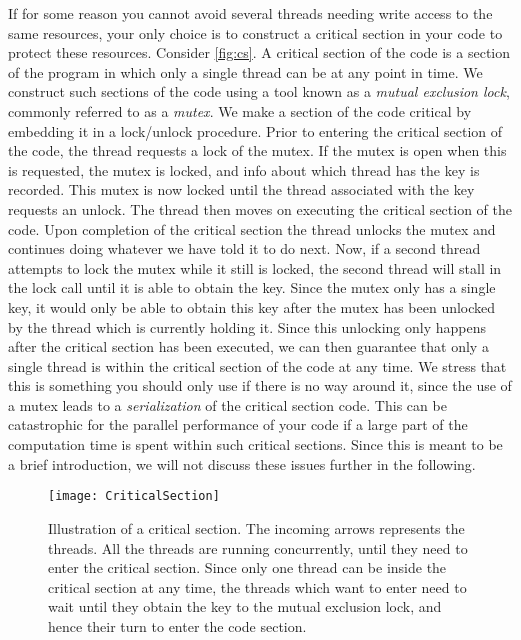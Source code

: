 If for some reason you cannot avoid several threads needing write access to the
same resources, your only choice is to construct a critical section in your code
to protect these resources. Consider \autoref{fig:cs}. A critical section of the
code is a section of the program in which only a single thread can be at any
point in time. We construct such sections of the code using a tool known as a
\emph{mutual exclusion lock}, commonly referred to as a \emph{mutex}. We make a
section of the code critical by embedding it in a lock/unlock procedure. Prior
to entering the critical section of the code, the thread requests a lock of the
mutex. If the mutex is open when this is requested, the mutex is locked, and
info about which thread has the key is recorded. This mutex is now locked until
the thread associated with the key requests an unlock. The thread then moves on
executing the critical section of the code. Upon completion of the critical
section the thread unlocks the mutex and continues doing whatever we have told
it to do next. Now, if a second thread attempts to lock the mutex while it still
is locked, the second thread will stall in the lock call until it is able to
obtain the key. Since the mutex only has a single key, it would only be able to
obtain this key after the mutex has been unlocked by the thread which is
currently holding it. Since this unlocking only happens after the critical
section has been executed, we can then guarantee that only a single thread is
within the critical section of the code at any time. We stress that this is
something you should only use if there is no way around it, since the use of a
mutex leads to a \emph{serialization} of the critical section code. This can be
catastrophic for the parallel performance of your code if a large part of the
computation time is spent within such critical sections. Since this is meant to
be a brief introduction, we will not discuss these issues further in the
following.

\begin{figure}
  \begin{center}
    \texttt{[image: CriticalSection]}
  \end{center}
  \caption{
    Illustration of a critical section. The incoming arrows represents the
    threads. All the threads are running concurrently, until they need to enter
    the critical section. Since only one thread can be inside the critical
    section at any time, the threads which want to enter need to wait until they
    obtain the key to the mutual exclusion lock, and hence their turn to enter
    the code section.
  }
  \label{fig:cs}
\end{figure}

